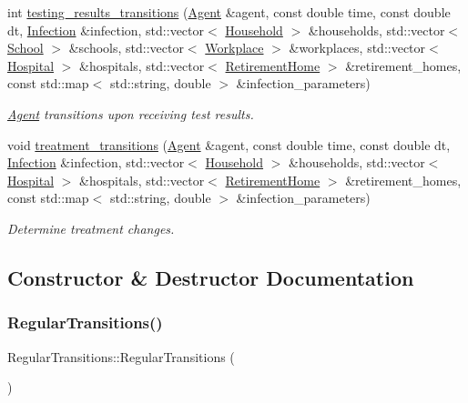 \begin{DoxyCompactItemize}
int \hyperlink{classRegularTransitions_aaa59782e3ac59d84006dc32ac783824c}{testing\+\_\+results\+\_\+transitions} (\hyperlink{classAgent}{Agent} \&agent, const double time, const double dt, \hyperlink{classInfection}{Infection} \&infection, std\+::vector$<$ \hyperlink{classHousehold}{Household} $>$ \&households, std\+::vector$<$ \hyperlink{classSchool}{School} $>$ \&schools, std\+::vector$<$ \hyperlink{classWorkplace}{Workplace} $>$ \&workplaces, std\+::vector$<$ \hyperlink{classHospital}{Hospital} $>$ \&hospitals, std\+::vector$<$ \hyperlink{classRetirementHome}{Retirement\+Home} $>$ \&retirement\+\_\+homes, const std\+::map$<$ std\+::string, double $>$ \&infection\+\_\+parameters)
\begin{DoxyCompactList}\small\item\em \hyperlink{classAgent}{Agent} transitions upon receiving test results. \end{DoxyCompactList}\item 
void \hyperlink{classRegularTransitions_a6e0b4dd6c6fa8b9e252951f794d46302}{treatment\+\_\+transitions} (\hyperlink{classAgent}{Agent} \&agent, const double time, const double dt, \hyperlink{classInfection}{Infection} \&infection, std\+::vector$<$ \hyperlink{classHousehold}{Household} $>$ \&households, std\+::vector$<$ \hyperlink{classHospital}{Hospital} $>$ \&hospitals, std\+::vector$<$ \hyperlink{classRetirementHome}{Retirement\+Home} $>$ \&retirement\+\_\+homes, const std\+::map$<$ std\+::string, double $>$ \&infection\+\_\+parameters)
\begin{DoxyCompactList}\small\item\em Determine treatment changes. \end{DoxyCompactList}\end{DoxyCompactItemize}


\subsection{Constructor \& Destructor Documentation}
\mbox{\label{classRegularTransitions_aa9908666aa96fd2ddcbe787da091dd7c}} 
\subsubsection{\texorpdfstring{Regular\+Transitions()}{RegularTransitions()}}
{\footnotesize\ttfamily Regular\+Transitions\+::\+Regular\+Transitions (\begin{DoxyParamCaption}{ }\end{DoxyParamCaption})\hspace{0.3cm}{\ttfamily [default]}}




